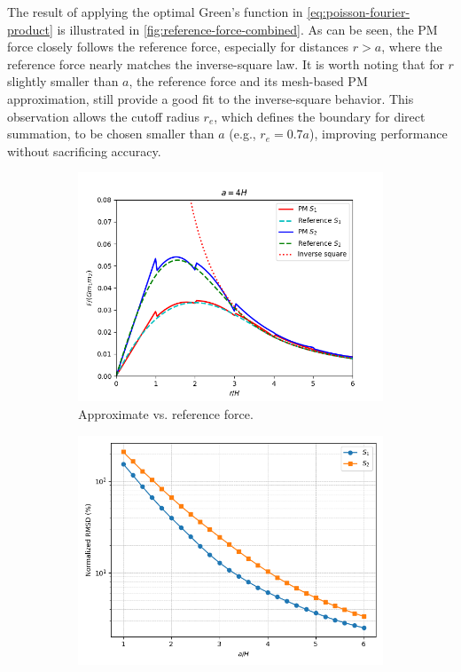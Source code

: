 The result of applying the optimal Green's function in \autoref{eq:poisson-fourier-product} is illustrated in \autoref{fig:reference-force-combined}.
As can be seen, the PM force closely follows the reference force, especially for distances \( r > a \), where the reference force nearly matches the inverse-square law.
It is worth noting that for \( r \) slightly smaller than \( a \), the reference force and its mesh-based PM approximation, still provide a good fit to the inverse-square behavior.
This observation allows the cutoff radius \( r_e \), which defines the boundary for direct summation, to be chosen smaller than \( a \) (e.g., \( r_e = 0.7a \)), improving performance without sacrificing accuracy.
\begin{figure}[htp]
    \centering
    \begin{subfigure}[b]{0.48\textwidth}
        \centering
        \includegraphics[width=\textwidth]{chapters/p3m-method/img/s1-vs-s2.png}
        \caption{Approximate vs. reference force.}
        \label{fig:reference-force-approx-sub}
    \end{subfigure}
    \hfill
    \begin{subfigure}[b]{0.48\textwidth}
        \centering
        \includegraphics[width=\textwidth]{chapters/p3m-method/img/s1-vs-s2-nrmsd.png}

\end{subfigure}
\end{figure}
